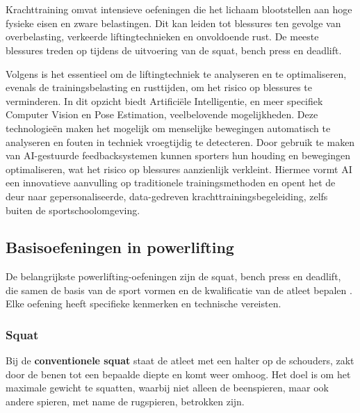 \chapter{}%
\label{ch:stand-van-zaken}



Krachttraining omvat intensieve oefeningen die het lichaam blootstellen aan hoge fysieke eisen en zware belastingen. 
Dit kan leiden tot blessures ten gevolge van overbelasting, verkeerde liftingtechnieken en onvoldoende rust. 
De meeste blessures treden op tijdens de uitvoering van de squat, bench press en deadlift. 

\medskip

Volgens \textcite{BengtssonEtAl2018} is het essentieel om de liftingtechniek te analyseren en te optimaliseren, evenals de trainingsbelasting en rusttijden, om het risico op blessures te verminderen.
In dit opzicht biedt Artificiële Intelligentie, en meer specifiek Computer Vision en Pose Estimation, veelbelovende mogelijkheden.
Deze technologieën maken het mogelijk om menselijke bewegingen automatisch te analyseren en fouten in techniek vroegtijdig te detecteren. 
Door gebruik te maken van AI-gestuurde feedbacksystemen kunnen sporters hun houding en bewegingen optimaliseren, wat het risico op blessures aanzienlijk verkleint. 
Hiermee vormt AI een innovatieve aanvulling op traditionele trainingsmethoden en opent het de deur naar gepersonaliseerde, data-gedreven krachttrainingsbegeleiding, zelfs buiten de sportschoolomgeving.

\section{Basisoefeningen in powerlifting}
\label{sec:basisoefeningen-in-powerlifting}
De belangrijkste powerlifting-oefeningen zijn de squat, bench press en deadlift, die samen de basis van de sport vormen en de kwalificatie van de atleet bepalen \autocite{TymchikEtAl2021}. 
Elke oefening heeft specifieke kenmerken en technische vereisten.

\subsection{Squat}
\label{subsec:squat}
Bij de \textbf{conventionele squat} staat de atleet met een halter op de schouders, zakt door de benen tot een bepaalde diepte en komt weer omhoog. 
Het doel is om het maximale gewicht te squatten, waarbij niet alleen de beenspieren, maar ook andere spieren, met name de rugspieren, betrokken zijn.

